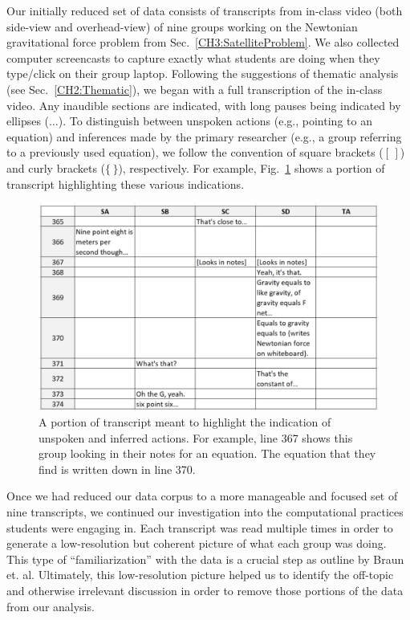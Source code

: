 \documentclass{msuphddissertation}
\begin{document}
\begin{doublespace}
Our initially reduced set of data consists of transcripts from in-class video (both side-view and overhead-view) of nine groups working on the Newtonian gravitational force problem from Sec.~\ref{CH3:SatelliteProblem}.  We also collected computer screencasts to capture exactly what students are doing when they type/click on their group laptop.  Following the suggestions of thematic analysis (see Sec.~\ref{CH2:Thematic}), we began with a full transcription of the in-class video.  Any inaudible sections are indicated, with long pauses being indicated by ellipses ($\ldots$).  To distinguish between unspoken actions (e.g., pointing to an equation) and inferences made by the primary researcher (e.g., a group referring to a previously used equation), we follow the convention of square brackets ($[\,]$) and curly brackets ($\{\,\}$), respectively.  For example, Fig.~\ref{CH5:Transcript} shows a portion of transcript highlighting these various indications.

\begin{figure}\centering
\includegraphics[scale=0.5]{./images/CH5Transcript.pdf}
\caption{A portion of transcript meant to highlight the indication of unspoken and inferred actions.  For example, line 367 shows this group looking in their notes for an equation.  The equation that they find is written down in line 370.}\label{CH5:Transcript}
\end{figure}

Once we had reduced our data corpus to a more manageable and focused set of nine transcripts, we continued our investigation into the computational practices students were engaging in.  Each transcript was read multiple times in order to generate a low-resolution but coherent picture of what each group was doing.  This type of ``familiarization'' with the data is a crucial step as outline by Braun et. al.  Ultimately, this low-resolution picture helped us to identify the off-topic and otherwise irrelevant discussion in order to remove those portions of the data from our analysis.


\end{doublespace}
\end{document}
